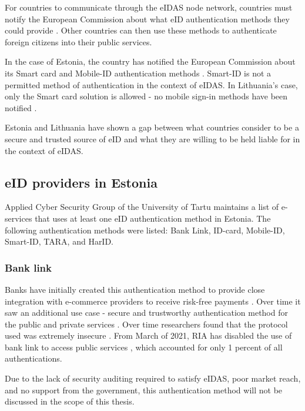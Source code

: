 For countries to communicate through the eIDAS node network, countries must notify the European Commission about what eID authentication methods they could provide \cite{eulaw-eidas}. Other countries can then use these methods to authenticate foreign citizens into their public services.

In the case of Estonia, the country has notified the European Commission about its Smart card and Mobile-ID authentication methods \cite{eulaw-eidas-notified}. Smart-ID is not a permitted method of authentication in the context of eIDAS. In Lithuania's case, only the Smart card solution is allowed - no mobile sign-in methods have been notified \cite{eulaw-eidas-notified}.

Estonia and Lithuania have shown a gap between what countries consider to be a secure and trusted source of eID and what they are willing to be held liable for in the context of eIDAS.

\subsection{eID providers in Estonia}

Applied Cyber Security Group of the University of Tartu maintains a list of e-services \cite{ut-eidinestonia} that uses at least one eID authentication method in Estonia. The following authentication methods were listed: Bank Link, ID-card, Mobile-ID, Smart-ID, TARA, and HarID.

\subsubsection{Bank link}

Banks have initially created this authentication method to provide close integration with e-commerce providers to receive risk-free payments \cite{kerem2003internet}. Over time it saw an additional use case - secure and trustworthy authentication method for the public and private services \cite{sebbanklink}. Over time researchers found that the protocol used was extremely insecure \cite{banklinksecurityanalysis}. From March of 2021, RIA has disabled the use of bank link to access public services \cite{ria-deprecates-bank-link}, which accounted for only 1 percent of all authentications.

Due to the lack of security auditing required to satisfy eIDAS, poor market reach, and no support from the government, this authentication method will not be discussed in the scope of this thesis.


